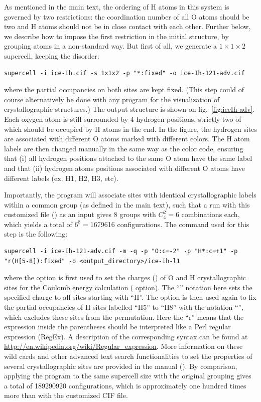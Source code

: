 \documentclass[a4paper,10pt]{article}
\begin{document}
As mentioned in the main text, the ordering of H atoms in this system is governed by two restrictions: the coordination number of all O atoms should be two and H atoms should not be in close contact with each other. Further below, we describe how to impose the first restriction in the initial structure, by grouping atoms in a non-standard way. But first of all, we generate a $1\times1\times2$ supercell, keeping the disorder:
\begin{Verbatim}[breaklines]
  supercell -i ice-Ih.cif -s 1x1x2 -p "*:fixed" -o ice-Ih-121-adv.cif
\end{Verbatim}
where the partial occupancies on both sites are kept fixed. (This step could of course alternatively be done with any program for the visualization of crystallographic structures.) The output structure is shown on fig.~\ref{fig:iceIh-adv}. Each oxygen atom is still surrounded by 4 hydrogen positions, strictly two of which should be occupied by H atoms in the end. In the figure, the hydrogen sites are associated with different O atoms marked with different colors. The H atom labels are then changed manually in the same way as the color code, ensuring that (i) all hydrogen positions attached to the same O atom have the same label and that (ii) hydrogen atoms positions associated with different O atoms have different labels (ex. H1, H2, H3, etc).

Importantly, the \sups{} program will associate sites with identical crystallographic labels within a common group (as defined in the main text), such that a run with this customized file () as an input gives 8 groups with $C^2_4=6$ combinations each, which yields a total of $6^8=$\num{1679616} configurations. The \sups{} command used for this step is the following:
\begin{Verbatim}[breaklines]
  supercell -i ice-Ih-121-adv.cif -m -q -p "O:c=-2" -p "H*:c=+1" -p "r(H[5-8]):fixed" -o <output_directory>/ice-Ih-l1
\end{Verbatim}
where the  option is first used to set the charges () of O and H crystallographic sites for the Coulomb energy calculation ( option). The ``'' notation here sets the specified charge to all sites starting with ``H''. The  option is then used again to fix the partial occupancies of H sites labelled ``H5'' to ``H8'' with the notation ``'', which excludes these sites from the permutation. Here the ``r'' means that the expression inside the parentheses should be interpreted like a Perl regular expression (RegEx). A description of the corresponding syntax can be found at \url{http://en.wikipedia.org/wiki/Regular_expression}. More information on these wild cards and other advanced text search functionalities to set the properties of several crystallographic sites are provided in the manual (). By comparison, applying the \sups{} program to the same supercell size with the original grouping gives a total of \num{189290920} configurations, which is approximately one hundred times more than with the customized CIF file.
\end{document}
